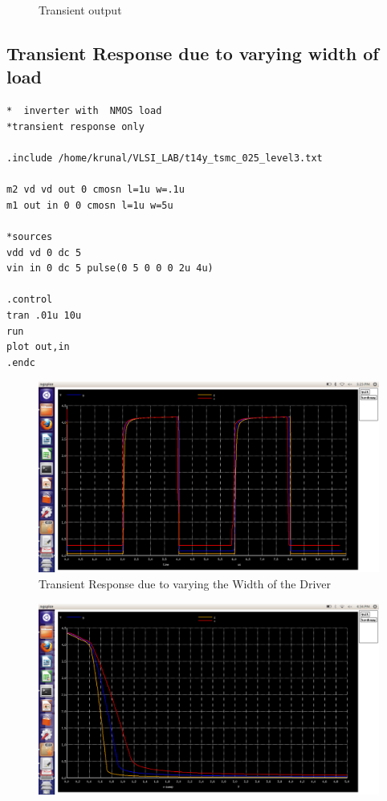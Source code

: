 \documentclass[12pt,a4paper]{article}
\begin{document}
\begin{center}
\begin{figure}[!ht]
\caption[Short]{Transient output}
\end{figure}

\clearpage
\subsection{Transient Response due to varying width of load}
\begin{lstlisting}
*  inverter with  NMOS load
*transient response only

.include /home/krunal/VLSI_LAB/t14y_tsmc_025_level3.txt

m2 vd vd out 0 cmosn l=1u w=.1u
m1 out in 0 0 cmosn l=1u w=5u

*sources
vdd vd 0 dc 5 
vin in 0 dc 5 pulse(0 5 0 0 0 2u 4u)

.control
tran .01u 10u
run
plot out,in
.endc
\end{lstlisting}

\begin{figure}[!ht]
\centering
\includegraphics[scale=0.37]{lab4_pic4_2_transient_dueto_varing_Wof_deiver.png}

\caption[Short]{Transient Response due to varying the Width of the Driver}
\end{figure}
\clearpage



\begin{figure}[!ht]
\centering
\includegraphics[scale=0.37]{lab4_pic4_3_transfer_dueto_varing_Wof_driver.png}


\end{figure}
\end{center}
\end{document}
